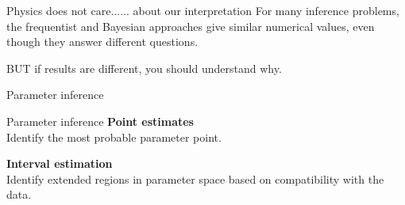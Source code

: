 \documentclass[
aspectratio=169,
14pt,
professionalfonts
]{beamer}
\begin{document}
\begin{frame}{Physics does not care...}{... about our interpretation}
For many inference problems, the frequentist and Bayesian approaches give similar numerical values, even though they answer different questions.

\vspace{0.5cm}

BUT if results are different, you should understand why.
\end{frame}

\begin{frame}
\center
\Large
Parameter inference
\end{frame}

\begin{frame}{Parameter inference}
    \center
    \textbf{Point estimates}\\
    Identify the most probable parameter point.

    \vspace{1cm}

    \textbf{Interval estimation}\\
    Identify extended regions in parameter space based on compatibility with the data.
\end{frame}
\end{document}
